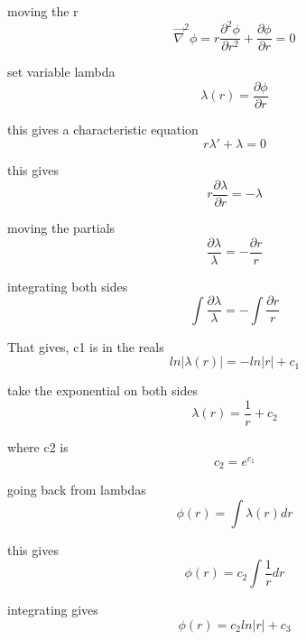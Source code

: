 \documentclass{article}
\begin{document}
moving the r
\begin{equation}
\vec{\nabla}^2\phi = r\frac{\partial^2\phi}{\partial r^2}+\frac{\partial\phi}{\partial r}=0
\label{9}
\end{equation}

set variable lambda
\begin{equation}
\lambda(r) = \frac{\partial\phi}{\partial r}
\label{10}
\end{equation}

this gives a characteristic equation
\begin{equation}
r\lambda ' + \lambda = 0
\label{11}
\end{equation}

this gives
\begin{equation}
r\frac{\partial \lambda}{\partial r} = -\lambda
\label{12}
\end{equation}

moving the partials
\begin{equation}
\frac{\partial \lambda}{\lambda}=-\frac{\partial r}{r}
\label{13}
\end{equation}

integrating both sides
\begin{equation}
\int\frac{\partial \lambda}{\lambda}=-\int\frac{\partial r}{r}
\label{14}
\end{equation}

That gives, c1 is in the reals
\begin{equation}
ln|\lambda(r)|=-ln|r| + c_1
\label{15}
\end{equation}


take the exponential on both sides
\begin{equation}
\lambda(r)=\frac{1}{r} + c_2
\label{16}
\end{equation}

where c2 is
\begin{equation}
c_2=e^{c_1}
\label{17}
\end{equation}

going back from lambdas
\begin{equation}
\phi(r)=\int\lambda(r)dr
\label{18}
\end{equation}

this gives
\begin{equation}
\phi(r)=c_2 \int\frac{1}{r}dr
\label{19}
\end{equation}

integrating gives
\begin{equation}
\phi(r)=c_2ln|r| + c_3
\label{20}
\end{equation}
\end{document}
